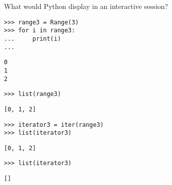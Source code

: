 \question What would Python display in an interactive session?

\begin{lstlisting}
>>> range3 = Range(3)
>>> for i in range3:
...     print(i)
...
\end{lstlisting}
\begin{solution}[.5in]
\begin{lstlisting}
0
1
2
\end{lstlisting}
\end{solution}

\begin{lstlisting}
>>> list(range3)
\end{lstlisting}
\begin{solution}[.25in]
\begin{lstlisting}
[0, 1, 2]
\end{lstlisting}
\end{solution}

\begin{lstlisting}
>>> iterator3 = iter(range3)
>>> list(iterator3)
\end{lstlisting}
\begin{solution}[.25in]
\begin{lstlisting}
[0, 1, 2]
\end{lstlisting}
\end{solution}

\begin{lstlisting}
>>> list(iterator3)
\end{lstlisting}
\begin{solution}[.25in]
\begin{lstlisting}
[]
\end{lstlisting}
\end{solution}

